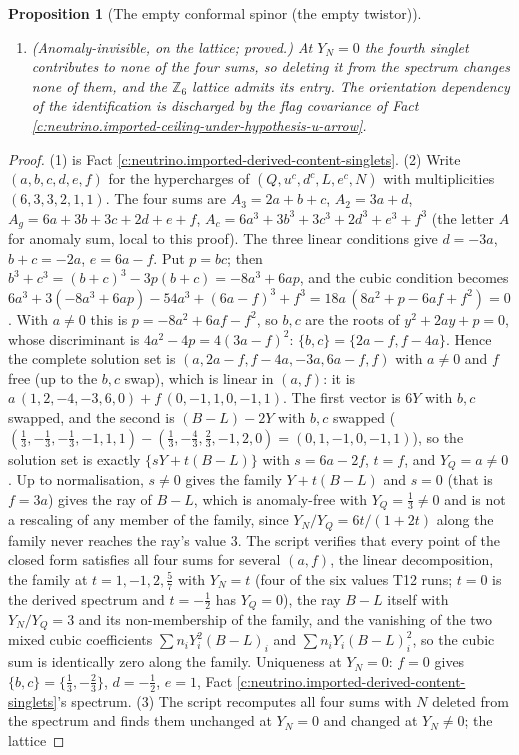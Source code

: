 \documentclass[11pt]{article}
\newtheorem{proposition}[theorem]{Proposition}
\theoremstyle{definition}
\theoremstyle{plain}
\begin{document}
\begin{proposition}[The empty conformal spinor (the empty twistor)]
\begin{enumerate}
\item \emph{(Anomaly-invisible, on the lattice; proved.)} At $Y_{N} = 0$ the fourth singlet contributes to none of the four sums, so deleting it from the spectrum changes none of them, and the $\mathbb{Z}_{6}$ lattice admits its entry. The orientation dependency of the identification is discharged by the flag covariance of Fact \ref{c:neutrino.imported-ceiling-under-hypothesis-u-arrow}.
\end{enumerate}
\end{proposition}
\begin{proof}
(1) is Fact \ref{c:neutrino.imported-derived-content-singlets}. (2) Write $(a, b, c, d, e, f)$ for the hypercharges of $(Q, u^{c}, d^{c}, L, e^{c}, N)$ with multiplicities $(6, 3, 3, 2, 1, 1)$. The four sums are $A_{3} = 2a + b + c$, $A_{2} = 3a + d$, $A_{g} = 6a + 3b + 3c + 2d + e + f$, $A_{c} = 6a^{3} + 3b^{3} + 3c^{3} + 2d^{3} + e^{3} + f^{3}$ (the letter $A$ for anomaly sum, local to this proof). The three linear conditions give $d = -3a$, $b + c = -2a$, $e = 6a - f$. Put $p = bc$; then $b^{3} + c^{3} = (b + c)^{3} - 3p(b + c) = -8a^{3} + 6ap$, and the cubic condition becomes $6a^{3} + 3(-8a^{3} + 6ap) - 54a^{3} + (6a - f)^{3} + f^{3} = 18a\,(8a^{2} + p - 6af + f^{2}) = 0$. With $a \neq 0$ this is $p = -8a^{2} + 6af - f^{2}$, so $b, c$ are the roots of $y^{2} + 2ay + p = 0$, whose discriminant is $4a^{2} - 4p = 4(3a - f)^{2}$: $\{b, c\} = \{2a - f, f - 4a\}$. Hence the complete solution set is $(a, 2a - f, f - 4a, -3a, 6a - f, f)$ with $a \neq 0$ and $f$ free (up to the $b, c$ swap), which is linear in $(a, f)$: it is $a\,(1, 2, -4, -3, 6, 0) + f\,(0, -1, 1, 0, -1, 1)$. The first vector is $6Y$ with $b, c$ swapped, and the second is $(B - L) - 2Y$ with $b, c$ swapped ($(\tfrac13, -\tfrac13, -\tfrac13, -1, 1, 1) - (\tfrac13, -\tfrac43, \tfrac23, -1, 2, 0) = (0, 1, -1, 0, -1, 1)$), so the solution set is exactly $\{sY + t(B - L)\}$ with $s = 6a - 2f$, $t = f$, and $Y_{Q} = a \neq 0$. Up to normalisation, $s \neq 0$ gives the family $Y + t(B - L)$ and $s = 0$ (that is $f = 3a$) gives the ray of $B - L$, which is anomaly-free with $Y_{Q} = \tfrac13 \neq 0$ and is not a rescaling of any member of the family, since $Y_{N}/Y_{Q} = 6t/(1 + 2t)$ along the family never reaches the ray's value $3$. The script verifies that every point of the closed form satisfies all four sums for several $(a, f)$, the linear decomposition, the family at $t = 1, -1, 2, \tfrac57$ with $Y_{N} = t$ (four of the six values T12 runs; $t = 0$ is the derived spectrum and $t = -\tfrac12$ has $Y_{Q} = 0$), the ray $B - L$ itself with $Y_{N}/Y_{Q} = 3$ and its non-membership of the family, and the vanishing of the two mixed cubic coefficients $\sum n_{i}Y_{i}^{2}(B - L)_{i}$ and $\sum n_{i}Y_{i}(B - L)_{i}^{2}$, so the cubic sum is identically zero along the family. Uniqueness at $Y_{N} = 0$: $f = 0$ gives $\{b, c\} = \{\tfrac13, -\tfrac23\}$, $d = -\tfrac12$, $e = 1$, Fact \ref{c:neutrino.imported-derived-content-singlets}'s spectrum. (3) The script recomputes all four sums with $N$ deleted from the spectrum and finds them unchanged at $Y_{N} = 0$ and changed at $Y_{N} \neq 0$; the lattice 
\end{proof}
\end{document}
